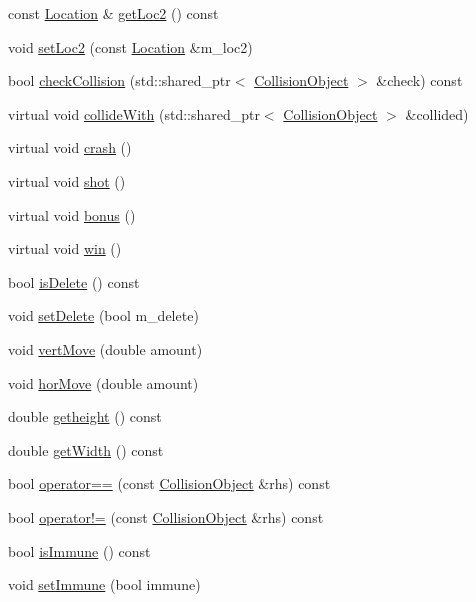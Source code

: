 \begin{DoxyCompactItemize}
const \hyperlink{classroadfighter_1_1Location}{Location} \& \hyperlink{classroadfighter_1_1CollisionObject_aa7412cf56663bc98b1454a8ae54ac2b0}{get\+Loc2} () const
\item 
void \hyperlink{classroadfighter_1_1CollisionObject_a8f566d1ea28f2ed16723572617abd583}{set\+Loc2} (const \hyperlink{classroadfighter_1_1Location}{Location} \&m\+\_\+loc2)
\item 
bool \hyperlink{classroadfighter_1_1CollisionObject_a426a06907212c866a22cba7ec84ebe65}{check\+Collision} (std\+::shared\+\_\+ptr$<$ \hyperlink{classroadfighter_1_1CollisionObject}{Collision\+Object} $>$ \&check) const
\item 
virtual void \hyperlink{classroadfighter_1_1CollisionObject_a9eba85551432f548f2a0c20217a60f42}{collide\+With} (std\+::shared\+\_\+ptr$<$ \hyperlink{classroadfighter_1_1CollisionObject}{Collision\+Object} $>$ \&collided)
\item 
virtual void \hyperlink{classroadfighter_1_1CollisionObject_a9a5265d810f0ed7583b60046ab3fa88c}{crash} ()
\item 
virtual void \hyperlink{classroadfighter_1_1CollisionObject_a55d891b6d9b50abdc44f964a40a7777c}{shot} ()
\item 
virtual void \hyperlink{classroadfighter_1_1CollisionObject_ad35887bb3cfb8c054eaaee56306d6944}{bonus} ()
\item 
virtual void \hyperlink{classroadfighter_1_1CollisionObject_aa793e1b9943ee90bbb4129ddd06b9be7}{win} ()
\item 
bool \hyperlink{classroadfighter_1_1CollisionObject_a2891183d9769adbc9a9c0dc65db1af10}{is\+Delete} () const
\item 
void \hyperlink{classroadfighter_1_1CollisionObject_a454547da963cd4d7e09f57bc64a0f984}{set\+Delete} (bool m\+\_\+delete)
\item 
void \hyperlink{classroadfighter_1_1CollisionObject_aaf92d0fe335daa016b5131835602bc1d}{vert\+Move} (double amount)
\item 
void \hyperlink{classroadfighter_1_1CollisionObject_a907fbb9f4a45996690b4f35bc4256e47}{hor\+Move} (double amount)
\item 
double \hyperlink{classroadfighter_1_1CollisionObject_a0c83b40afb7be4ed3b501a79c2a81b9b}{getheight} () const
\item 
double \hyperlink{classroadfighter_1_1CollisionObject_ab8692ffb0324d39a96f31c780f7a8172}{get\+Width} () const
\item 
bool \hyperlink{classroadfighter_1_1CollisionObject_ad93e53a2b4fdc7c7882a566b74cecfad}{operator==} (const \hyperlink{classroadfighter_1_1CollisionObject}{Collision\+Object} \&rhs) const
\item 
bool \hyperlink{classroadfighter_1_1CollisionObject_ada8d62684274b10fc4f19e441413da23}{operator!=} (const \hyperlink{classroadfighter_1_1CollisionObject}{Collision\+Object} \&rhs) const
\item 
bool \hyperlink{classroadfighter_1_1CollisionObject_a4e5e9b3749d6506ad037118f1ead8c53}{is\+Immune} () const
\item 
void \hyperlink{classroadfighter_1_1CollisionObject_a5be38a4125e25e85ff094aeca94c7d8e}{set\+Immune} (bool immune)
\end{DoxyCompactItemize}


